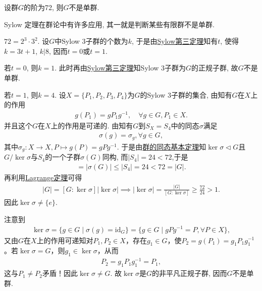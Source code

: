 \documentclass[../../main.tex]{subfiles}%
\begin{document}
\begin{example}
设群$G$的阶为72, 则$G$不是单群.
\end{example}
\begin{remark}
Sylow 定理在群论中有许多应用, 其一就是判断某些有限群不是单群.
\end{remark}
\begin{solution}
$72=2^3\cdot 3^2$. 设$G$中Sylow 3子群的个数为$k$, 于是由\hyperref[theorem:Sylow第三定理]{Sylow第三定理}知有$t$, 使得$k=3t+1$, $k|8$, 因而$t=0$或$t=1$.

若$t=0$, 则$k=1$. 此时再由\hyperref[theorem:Sylow第三定理]{Sylow第三定理}知Sylow 3子群为$G$的正规子群, 故$G$不是单群.

若$t=1$, 则$k=4$. 设$X=\{P_1,P_2,P_3,P_4\}$为$G$的Sylow 3子群的集合, 由知有$G$在$X$上的作用
\begin{align*}
g(P_1)=gP_1g^{-1}, \quad \forall g\in G, P_1\in X.
\end{align*}
并且这个$G$在$X$上的作用是可递的.
由知有$G$到$S_X=S_4$中的同态$\sigma$满足
\begin{align*}
\sigma \left( g \right) =\sigma _g,\forall g\in G,
\end{align*}
其中$\sigma _g:X\rightarrow X,P\longmapsto g\left( P \right) =gPg^{-1}.$
于是由\hyperref[theorem:群的同态基本定理]{群的同态基本定理}知$\ker \sigma \lhd G$且$G/\ker\sigma$与$S_4$的一个子群$\sigma(G)$同构, 而$|S_4|=24<72$,于是
\begin{align*}
[G:\ker\sigma] = |\sigma(G)| \leqslant |S_4| = 24 < 72 = |G|.
\end{align*}
再利用\hyperref[theorem:抽象代数--Lagrange定理]{Lagrange定理}可得
\begin{align*}
|G| = [G:\ker\sigma]|\ker\sigma| \implies |\ker\sigma| = \frac{|G|}{[G:\ker\sigma]} \geqslant \frac{72}{24} > 1.
\end{align*}
因此$\ker\sigma \neq \{e\}$.

注意到
\begin{align*}
\ker\sigma = \{ g \in G \mid \sigma(g) = \mathrm{id}_G \} = \{ g \in G \mid gPg^{-1} = P, \forall P \in X \},
\end{align*}
又由$G$在$X$上的作用可递知对$P_1,P_2 \in X$，存在$g_1 \in G$，使$P_2 = g(P_1) = g_1P_1g_1^{-1}$。若$\ker\sigma = G$，则$g_1 \in \ker\sigma$，从而
\begin{align*}
P_2 = g_1P_1g_1^{-1} = P_1,
\end{align*}
这与$P_1 \neq P_2$矛盾！因此$\ker \sigma\neq G$. 故$\ker\sigma$是$G$的非平凡正规子群, 因而$G$不是单群.

\end{solution}
\end{document}
